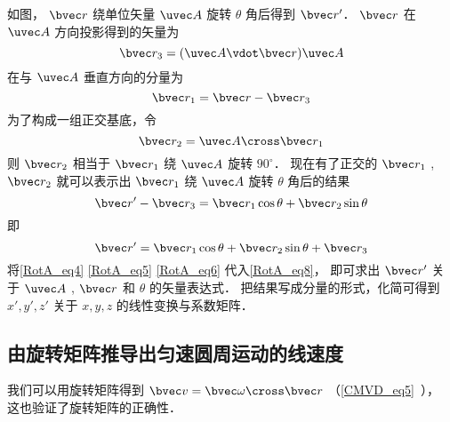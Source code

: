 如图， $\bvec r$ 绕单位矢量 $\uvec A$ 旋转 $\theta$ 角后得到 $\bvec r'$．  $\bvec r$ 在 $\uvec A$ 方向投影得到的矢量为
\begin{equation}\label{RotA_eq4}
\bvec r_3 = (\uvec A \vdot \bvec r)\uvec A
\end{equation}
在与 $\uvec A$ 垂直方向的分量为
\begin{equation}\label{RotA_eq5}
\bvec r_1 = \bvec r - \bvec r_3
\end{equation}
为了构成一组正交基底，令
\begin{equation}\label{RotA_eq6}
\bvec r_2 = \uvec A \cross \bvec r_1
\end{equation}
则 $\bvec r_2$ 相当于 $\bvec r_1$ 绕 $\uvec A$ 旋转 $90^\circ$． 现在有了正交的 $\bvec r_1$ , $\bvec r_2$  就可以表示出 $\bvec r_1$ 绕 $\uvec A$ 旋转 $\theta$ 角后的结果
\begin{equation}
\bvec r' - \bvec r_3 = \bvec r_1\cos \theta  + \bvec r_2\sin \theta
\end{equation}
即
\begin{equation}\label{RotA_eq8}
\bvec r' = \bvec r_1\cos \theta  + \bvec r_2\sin \theta  + \bvec r_3
\end{equation} 
将\autoref{RotA_eq4} \autoref{RotA_eq5} \autoref{RotA_eq6} 代入\autoref{RotA_eq8}， 即可求出 $\bvec r'$ 关于 $\uvec A$ , $\bvec r$ 和 $\theta $ 的矢量表达式． 把结果写成分量的形式，化简可得到 $x',y',z'$ 关于 $x,y,z$ 的线性变换与系数矩阵．

\subsection{由旋转矩阵推导出匀速圆周运动的线速度} 

我们可以用旋转矩阵得到 $\bvec v = \bvec \omega  \cross \bvec r$ （\autoref{CMVD_eq5}~）， 这也验证了旋转矩阵的正确性．

